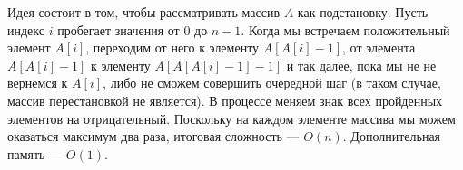 \documentclass{article}
\begin{document}
Идея состоит в том, чтобы рассматривать массив $A$ как подстановку. Пусть индекс $i$ пробегает значения от $0$ до $n-1$. Когда мы встречаем положительный элемент $A[i]$, переходим от него к элементу 
$A[A[i]-1]$, от элемента $A[A[i]-1]$ к элементу $A[A[A[i]-1]-1]$ и так далее, пока мы не не вернемся к $A[i]$, либо не сможем совершить очередной шаг (в таком случае, массив перестановкой не является). В процессе меняем знак всех пройденных элементов на отрицательный. Поскольку на каждом элементе массива мы можем оказаться максимум два раза, итоговая сложность --- $O(n)$. Дополнительная память --- $O(1)$.
\end{document}
